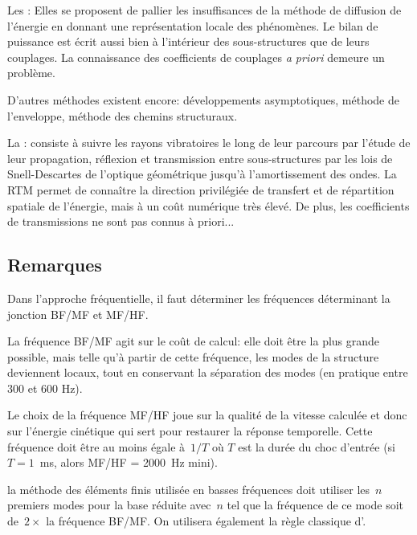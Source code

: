 \bigskip
Les : Elles se proposent de pallier les insuffisances de la méthode de diffusion de l'énergie en donnant une représentation locale des phénomènes. Le bilan de puissance est écrit aussi bien à l'intérieur des sous-structures que de leurs couplages. La connaissance des coefficients de couplages \emph{a priori} demeure un problème.

\bigskip
D'autres méthodes existent encore: développements asymptotiques, méthode de l'enveloppe, méthode des chemins structuraux.

La : consiste à suivre les rayons vibratoires le long de leur parcours par l'étude de leur propagation, réflexion et transmission entre sous-structures par les lois de Snell-Descartes de l'optique géométrique jusqu'à l'amortissement des ondes. La RTM permet de connaître la direction privilégiée de transfert et de répartition spatiale de l'énergie, mais à un coût numérique très élevé. De plus, les coefficients de transmissions ne sont pas connus à priori...

\medskip
\subsection{Remarques}

Dans l'approche fréquentielle, il faut déterminer les fréquences déterminant la jonction BF/MF et MF/HF.

La fréquence BF/MF agit sur le coût de calcul: elle doit être la plus grande possible, mais telle qu'à partir de cette fréquence, les modes de la structure deviennent locaux, tout en conservant la séparation des modes (en pratique entre 300 et 600 Hz).

Le choix de la fréquence MF/HF joue sur la qualité de la vitesse calculée et donc sur l'énergie cinétique qui sert pour restaurer la réponse temporelle. Cette fréquence doit être au moins égale à~$1/T$ où $T$ est la durée du choc d'entrée (si~$T=1$~ms, alors MF/HF = 2000~Hz mini).

la méthode des éléments finis utilisée en basses fréquences doit utiliser les~$n$ premiers modes pour la base réduite avec~$n$ tel que la fréquence de ce mode soit de~$2\times$ la fréquence BF/MF. On utilisera également la règle classique d'.

